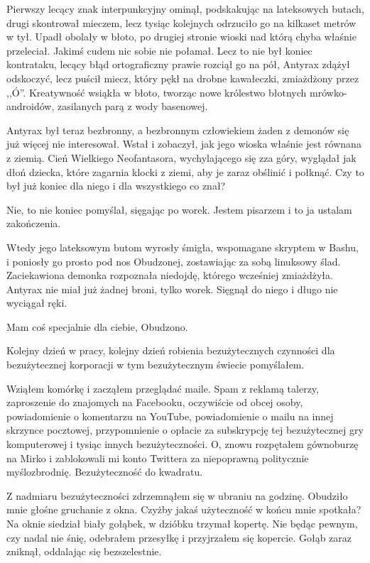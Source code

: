 Pierwszy lecący znak interpunkcyjny ominął, podskakując na lateksowych butach, drugi skontrował mieczem, lecz tysiąc kolejnych odrzuciło go na kilkaset metrów w tył.
Upadł obolały w błoto, po drugiej stronie wioski nad którą chyba właśnie przeleciał. Jakimś cudem nic sobie nie połamał.
Lecz to nie był koniec kontrataku, lecący błąd ortograficzny prawie rozciął go na pół, Antyrax zdążył odskoczyć, lecz puścił miecz, który pękł na drobne kawałeczki, zmiażdżony przez ,,Ó''.
Kreatywność wsiąkła w błoto, tworząc nowe królestwo błotnych mrówko-androidów, zasilanych parą z wody basenowej.

Antyrax był teraz bezbronny, a bezbronnym człowiekiem żaden z demonów się już więcej nie interesował. Wstał i zobaczył, jak jego wioska właśnie jest równana z ziemią.
Cień Wielkiego Neofantasora, wychylającego się zza góry, wyglądał jak dłoń dziecka, które zagarnia klocki z ziemi, aby je zaraz obślinić i połknąć.
Czy to był już koniec dla niego i dla wszystkiego co znał?

\ds{} Nie, to nie koniec \dm{} pomyślał, sięgając po worek. \dm Jestem pisarzem i to ja ustalam zakończenia. \de{}

Wtedy jego lateksowym butom wyrosły śmigła, wspomagane skryptem w Bashu, i poniosły go prosto pod nos Obudzonej, zostawiając za sobą linuksowy ślad.
Zaciekawiona demonka rozpoznała niedojdę, którego wcześniej zmiażdżyła.
Antyrax nie miał już żadnej broni, tylko worek. Sięgnął do niego i długo nie wyciągał ręki.

\ds{} Mam coś specjalnie dla ciebie, Obudzono. \de{}

\divider{}

\ds{} Kolejny dzień w pracy, kolejny dzień robienia bezużytecznych czynności dla bezużytecznej korporacji w tym bezużytecznym świecie \dm{} pomyślałem. \de{}

Wziąłem komórkę i zacząłem przeglądać maile.
Spam z reklamą talerzy, zaproszenie do znajomych na Facebooku, oczywiście od obcej osoby, powiadomienie o komentarzu na YouTube,
powiadomienie o mailu na innej skrzynce pocztowej, przypomnienie o opłacie za subskrypcję tej bezużytecznej gry komputerowej i tysiąc innych bezużyteczności.
O, znowu rozpętałem gównoburzę na Mirko i zablokowali mi konto Twittera za niepoprawną politycznie myślozbrodnię.
Bezużyteczność do kwadratu.

Z nadmiaru bezużyteczności zdrzemnąłem się w ubraniu na godzinę. Obudziło mnie głośne gruchanie z okna.
Czyżby jakaś użyteczność w końcu mnie spotkała?
Na oknie siedział biały gołąbek, w dzióbku trzymał kopertę.
Nie będąc pewnym, czy nadal nie śnię, odebrałem przesyłkę i przyjrzałem się kopercie.
Gołąb zaraz zniknął, oddalając się bezszelestnie.

